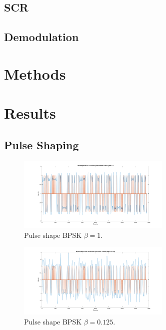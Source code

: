 \documentclass{article}
\begin{document}
\subsection{SCR}


\subsection{Demodulation}



\section{Methods}



\section{Results}

\subsection{Pulse Shaping}

\begin{figure}[h]
  \begin{center}
    \includegraphics[width=0.65\textwidth]{img/upsampled_bpsk_raised_cosine_beta_1.png}
    \caption{Pulse shape BPSK $\beta = 1$.}
  \end{center}
\end{figure}

\begin{figure}[h]
  \begin{center}
    \includegraphics[width=0.65\textwidth]{img/upsampled_bpsk_raised_cosine_beta_125.png}
    \caption{Pulse shape BPSK $\beta = 0.125$.}
  \end{center}
\end{figure}
\end{document}
